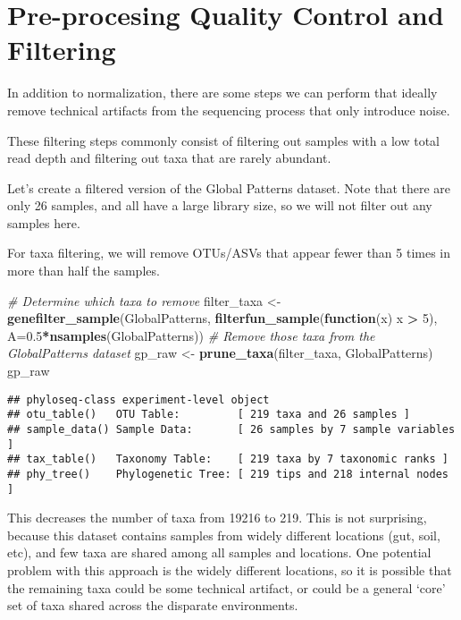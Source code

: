 \documentclass[
]{book}
\newenvironment{Shaded}{\begin{snugshade}}{\end{snugshade}}
\newcommand{\CommentTok}[1]{\textcolor[rgb]{0.56,0.35,0.01}{\textit{#1}}}
\newcommand{\ControlFlowTok}[1]{\textcolor[rgb]{0.13,0.29,0.53}{\textbf{#1}}}
\newcommand{\DataTypeTok}[1]{\textcolor[rgb]{0.13,0.29,0.53}{#1}}
\newcommand{\DecValTok}[1]{\textcolor[rgb]{0.00,0.00,0.81}{#1}}
\newcommand{\FloatTok}[1]{\textcolor[rgb]{0.00,0.00,0.81}{#1}}
\newcommand{\KeywordTok}[1]{\textcolor[rgb]{0.13,0.29,0.53}{\textbf{#1}}}
\newcommand{\NormalTok}[1]{#1}
\newcommand{\OperatorTok}[1]{\textcolor[rgb]{0.81,0.36,0.00}{\textbf{#1}}}
\newcommand{\StringTok}[1]{\textcolor[rgb]{0.31,0.60,0.02}{#1}}
\begin{document}
\hypertarget{pre-procesing-quality-control-and-filtering}{%
\section{Pre-procesing Quality Control and Filtering}\label{pre-procesing-quality-control-and-filtering}}

In addition to normalization, there are some steps we can perform that ideally remove technical artifacts from the sequencing process that only introduce noise.

These filtering steps commonly consist of filtering out samples with a low total read depth and filtering out taxa that are rarely abundant.

Let's create a filtered version of the Global Patterns dataset. Note that there are only 26 samples, and all have a large library size, so we will not filter out any samples here.

For taxa filtering, we will remove OTUs/ASVs that appear fewer than 5 times in more than half the samples.

\begin{Shaded}
\begin{Highlighting}[]
\CommentTok{\# Determine which taxa to remove}
\NormalTok{filter\_taxa \textless{}{-}}\StringTok{ }\KeywordTok{genefilter\_sample}\NormalTok{(GlobalPatterns,}
                                 \KeywordTok{filterfun\_sample}\NormalTok{(}\ControlFlowTok{function}\NormalTok{(x) x }\OperatorTok{\textgreater{}}\StringTok{ }\DecValTok{5}\NormalTok{),}
                                 \DataTypeTok{A=}\FloatTok{0.5}\OperatorTok{*}\KeywordTok{nsamples}\NormalTok{(GlobalPatterns))}
\CommentTok{\# Remove those taxa from the GlobalPatterns dataset}
\NormalTok{gp\_raw \textless{}{-}}\StringTok{ }\KeywordTok{prune\_taxa}\NormalTok{(filter\_taxa, GlobalPatterns)}
\NormalTok{gp\_raw}
\end{Highlighting}
\end{Shaded}

\begin{verbatim}
## phyloseq-class experiment-level object
## otu_table()   OTU Table:         [ 219 taxa and 26 samples ]
## sample_data() Sample Data:       [ 26 samples by 7 sample variables ]
## tax_table()   Taxonomy Table:    [ 219 taxa by 7 taxonomic ranks ]
## phy_tree()    Phylogenetic Tree: [ 219 tips and 218 internal nodes ]
\end{verbatim}

This decreases the number of taxa from 19216 to 219. This is not surprising, because this dataset contains samples from widely different locations (gut, soil, etc), and few taxa are shared among all samples and locations. One potential problem with this approach is the widely different locations, so it is possible that the remaining taxa could be some technical artifact, or could be a general `core' set of taxa shared across the disparate environments.
\end{document}
